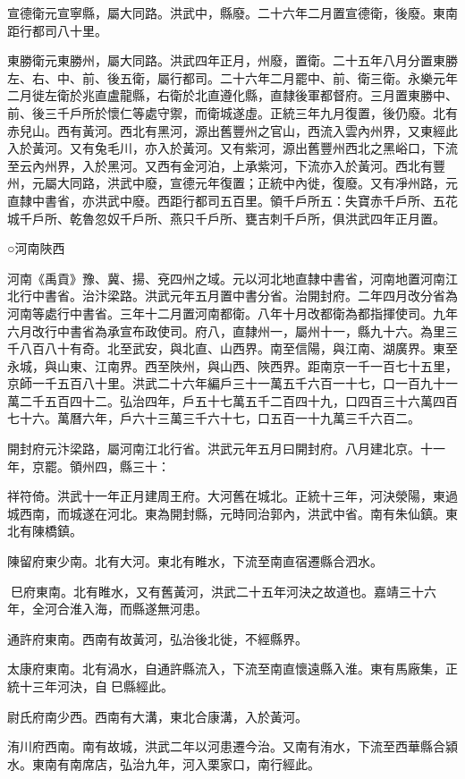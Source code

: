 宣德衛元宣寧縣，屬大同路。洪武中，縣廢。二十六年二月置宣德衛，後廢。東南距行都司八十里。

東勝衛元東勝州，屬大同路。洪武四年正月，州廢，置衛。二十五年八月分置東勝左、右、中、前、後五衛，屬行都司。二十六年二月罷中、前、衛三衛。永樂元年二月徙左衛於兆直盧龍縣，右衛於北直遵化縣，直隸後軍都督府。三月置東勝中、前、後三千戶所於懷仁等處守禦，而衛城遂虛。正統三年九月復置，後仍廢。北有赤兒山。西有黃河。西北有黑河，源出舊豐州之官山，西流入雲內州界，又東經此入於黃河。又有兔毛川，亦入於黃河。又有紫河，源出舊豐州西北之黑峪口，下流至云內州界，入於黑河。又西有金河泊，上承紫河，下流亦入於黃河。西北有豐州，元屬大同路，洪武中廢，宣德元年復置；正統中內徙，復廢。又有凈州路，元直隸中書省，亦洪武中廢。西距行都司五百里。領千戶所五：失寶赤千戶所、五花城千戶所、乾魯忽奴千戶所、燕只千戶所、甕吉刺千戶所，俱洪武四年正月置。


○河南陜西

河南《禹貢》豫、冀、揚、兗四州之域。元以河北地直隸中書省，河南地置河南江北行中書省。治汴梁路。洪武元年五月置中書分省。治開封府。二年四月改分省為河南等處行中書省。三年十二月置河南都衛。八年十月改都衛為都指揮使司。九年六月改行中書省為承宣布政使司。府八，直隸州一，屬州十一，縣九十六。為里三千八百八十有奇。北至武安，與北直、山西界。南至信陽，與江南、湖廣界。東至永城，與山東、江南界。西至陜州，與山西、陜西界。距南京一千一百七十五里，京師一千五百八十里。洪武二十六年編戶三十一萬五千六百一十七，口一百九十一萬二千五百四十二。弘治四年，戶五十七萬五千二百四十九，口四百三十六萬四百七十六。萬曆六年，戶六十三萬三千六十七，口五百一十九萬三千六百二。

開封府元汴梁路，屬河南江北行省。洪武元年五月曰開封府。八月建北京。十一年，京罷。領州四，縣三十：

祥符倚。洪武十一年正月建周王府。大河舊在城北。正統十三年，河決滎陽，東過城西南，而城遂在河北。東為開封縣，元時同治郭內，洪武中省。南有朱仙鎮。東北有陳橋鎮。

陳留府東少南。北有大河。東北有睢水，下流至南直宿遷縣合泗水。

巳府東南。北有睢水，又有舊黃河，洪武二十五年河決之故道也。嘉靖三十六年，全河合淮入海，而縣遂無河患。

通許府東南。西南有故黃河，弘治後北徙，不經縣界。

太康府東南。北有渦水，自通許縣流入，下流至南直懷遠縣入淮。東有馬廠集，正統十三年河決，自巳縣經此。

尉氏府南少西。西南有大溝，東北合康溝，入於黃河。

洧川府西南。南有故城，洪武二年以河患遷今治。又南有洧水，下流至西華縣合潁水。東南有南席店，弘治九年，河入栗家口，南行經此。

